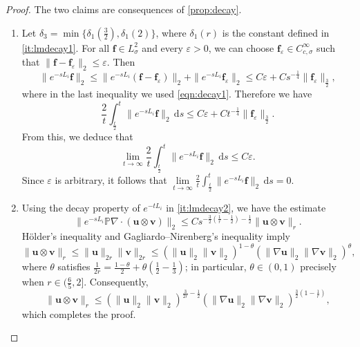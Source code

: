 \documentclass[10pt,a4paper]{amsart}
\newcommand{\Bf}{{\boldsymbol{f}}}
\newcommand{\bu}{{\boldsymbol{u}}}
\newcommand{\bv}{{\boldsymbol{v}}}
\begin{document}
\begin{proof} The two claims are consequences of \cref{prop:decay}.
\begin{enumerate}[label={(\roman*)}]
    \item Let $\delta_3=\min\{\delta_1(\frac{3}{2}),\delta_1(2)\}$, where $\delta_1(r)$ is the constant defined in \cref{it:lmdecay1}. 
For all $\Bf \in L^2_\sigma$ and every $\varepsilon > 0$, we can choose $\Bf_\varepsilon \in C_{c,\sigma}^{\infty}$ such that $\|\Bf - \Bf_\varepsilon\|_2 \le \varepsilon$. Then 
\[
\|e^{-sL_i} \Bf\|_2 
\le \|e^{-sL_i} (\Bf - \Bf_\varepsilon)\|_2 + \|e^{-sL_i} \Bf_\varepsilon\|_2 
\le C \varepsilon + C s^{-\frac{1}{4}} \|\Bf_\varepsilon\|_{\frac32},
\]
where in the last inequality we used \cref{eqn:decay1}. Therefore we have
\[
\frac{2}{t} \int_{\frac{t}{2}}^{t} \|e^{-sL_i} \Bf\|_2 \, \mathrm d s 
\le C\varepsilon + Ct^{-\frac{1}{4}} \|\Bf_\varepsilon\|_{\frac{3}{2}}.
\]
From this, we deduce that
\[
\lim_{t \to \infty} \frac{2}{t} \int_{\frac{t}{2}}^{t} \|e^{-sL_i} \Bf\|_2 \, \mathrm ds \le C \varepsilon.
\]
Since $\varepsilon$ is arbitrary, it follows that $\lim\limits_{t \to \infty} \frac{2}{t} \int_{\frac{t}{2}}^{t} \|e^{-sL_i} \Bf\|_2 \, \mathrm ds = 0$.\\

\item  Using the decay property of $e^{-tL_i}$ in \cref{it:lmdecay2}, we have the estimate
\[
\|e^{-sL_i} \mathbb{P} \nabla\cdot (\bu \otimes \bv)\|_2 
\leq C s^{-\frac{3}{2}\left(\frac{1}{r}-\frac{1}{2}\right) - \frac{1}{2}} \|\bu \otimes \bv\|_r.
\]
H\"older's inequality and Gagliardo--Nirenberg's inequality imply 
\[
\|\bu \otimes \bv\|_r 
\le \|\bu\|_{2r} \| \bv\|_{2r}
\le (\|\bu\|_{2}\|\bv\|_{2})^{1-\theta} 
(\|\nabla \bu\|_{2}\|\nabla \bv\|_{2})^{\theta},
\]
where $\theta$ satisfies $\frac{1}{2r}=\frac{1-\theta}{2}+\theta(\frac{1}{2}-\frac{1}{3})$; in particular, $\theta\in(0,1)$ precisely when $r\in(\frac{6}{5},2]$. Consequently,
\[
\|\bu \otimes \bv\|_r 
\le  (\|\bu\|_{2}\|\bv\|_{2})^{\frac{3}{2r}-\frac{1}{2}} 
(\|\nabla \bu\|_{2}\|\nabla \bv\|_{2})^{\frac{3}{2}(1-\frac{1}{r})},
\]
which completes the proof.
\end{enumerate}
\end{proof}
\end{document}
